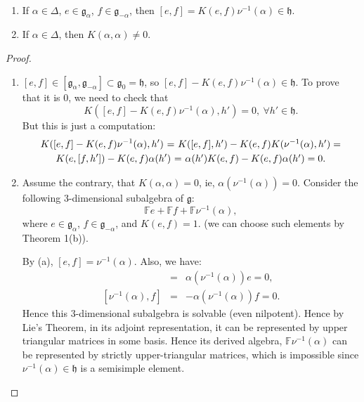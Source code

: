 \documentclass[12pt]{amsart}
\theoremstyle{definition}
\theoremstyle{definition}
\theoremstyle{definition}
\numberwithin{equation}{subsection}
\newcommand{\g}{\mathfrak{g}}
\newcommand{\h}{\mathfrak{h}}
\begin{document}
\begin{bigthm}\ 
\renewcommand{\labelenumi}{(\alph{enumi})}
\begin{enumerate}
\item If $\alpha \in \Delta$, $e \in \g_\alpha$, $f \in \g_{-\alpha}$, then
$[e,f] = K(e,f) \nu^{-1}(\alpha) \in \h$.
\item If $\alpha \in \Delta$, then $K(\alpha, \alpha) \neq 0$.
\end{enumerate}
\end{bigthm}
\begin{proof}\ 
\renewcommand{\labelenumi}{(\alph{enumi})}
\begin{enumerate}
\item $[e,f] \in [\g_{\alpha}, \g_{-\alpha}] \subset \g_0 = \h$, so
$[e,f] - K(e,f)\nu^{-1}(\alpha) \in \h$. To prove that it is 0, we need to check that
$$K([e,f] - K(e,f)\nu^{-1}(\alpha), h') = 0,\ \forall h' \in \h.$$
But this is just a computation:
\begin{multline*}
K([e,f] - K(e,f)\nu^{-1}(\alpha), h')$ = $K([e,f], h') - K(e,f) K(\nu^{-1}(\alpha), h') = \\
K(e, [f,h']) - K(e,f) \alpha(h')$ = $\alpha(h') K(e,f) - K(e,f) \alpha(h') = 0.
\end{multline*}
\item Assume the contrary, that $K(\alpha, \alpha) = 0$, ie, $\alpha(\nu^{-1}(\alpha)) = 0$. Consider
the following 3-dimensional subalgebra of $\g$:
$$\mathbb{F}e + \mathbb{F}f + \mathbb{F}\nu^{-1}(\alpha),$$ 
where $e \in \g_\alpha$, $f \in \g_{-\alpha}$, and $K(e,f) = 1$.
(we can choose such elements by Theorem 1(b)).

By (a), $[e,f] = \nu^{-1}(\alpha)$. Also, we have: 
\begin{eqnarray*} 
[\nu^{-1}(\alpha), e] & = & \alpha(\nu^{-1}(\alpha)) e = 0, \\{} 
[\nu^{-1}(\alpha), f] & = & -\alpha(\nu^{-1}(\alpha)) f = 0.
\end{eqnarray*}
Hence this 3-dimensional subalgebra is solvable (even nilpotent). Hence by Lie's Theorem,
in its adjoint representation, it can be represented by upper triangular matrices in some basis.
Hence its derived algebra, $\mathbb{F}\nu^{-1}(\alpha)$ can be represented by strictly upper-triangular
matrices, which is impossible since $\nu^{-1}(\alpha) \in \h$ is a semisimple element.
\end{enumerate}
\end{proof}
\end{document}
